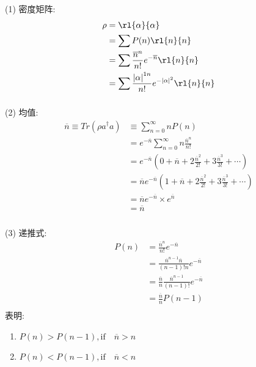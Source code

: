\begin{frame}
 \frametitle{}
  (1) 密度矩阵: 
  \[\begin{aligned} 
 \rho &=\rl{\alpha}{\alpha} \\ 
 &= \sum P(n) \rl{n}{n} \\ 
 & = \sum \frac{\overline{n}^n}{n!} e^{-\overline{n}} \rl{n}{n}  \\ 
 & = \sum \frac{\left|\alpha\right|^{1n}}{n!} e^{-\left|\alpha\right|^2} \rl{n}{n}  \\ 
\end{aligned}\] 
\end{frame}

\begin{frame}
 \frametitle{}
 (2) 均值:
 \[\begin{aligned} 
    \overline{n}  \equiv  Tr(\rho a^{\dagger} a) & \equiv  \sum_{n=0} ^{\infty} n  P(n) \\ 
    &= e^{-\overline{n}} \sum_{n=0} ^{\infty} n \frac{\overline{n}^n}{n!} \\ 
    &= e^{-\overline{n}} \left( 0+ \overline{n} + 2\frac{\overline{n}^2}{2!} +3\frac{\overline{n}^3}{3!} + \cdots \right) \\  
    &= \overline{n} e^{-\overline{n}} \left( 1+ \overline{n} + 2\frac{\overline{n}^2}{2!} +3\frac{\overline{n}^3}{3!} + \cdots \right) \\ 
    &= \overline{n} e^{-\overline{n}} \times e^{\overline{n}}  \\ 
    &= \overline{n} 
\end{aligned}\]     
\end{frame}

\begin{frame}
 \frametitle{}
   (3) 递推式: 
 \[\begin{aligned}
     P(n) &= \frac{\overline{n}^n}{n!} e^{-\overline{n}} \\ 
     &= \frac{\overline{n}^{n-1} \overline{n} }{(n-1)! n} e^{-\overline{n}} \\ 
     &= \frac{\overline{n}}{n}\frac{\overline{n}^{n-1}  }{(n-1)! } e^{-\overline{n}} \\ 
     &= \frac{\overline{n}}{n} P(n-1)\\ 
 \end{aligned}\]   
  表明:
  \begin{enumerate}
      \item $P(n)> P(n-1), \text{if} \quad  \overline{n}> n $
      \item $P(n)< P(n-1), \text{if} \quad \overline{n}< n $
  \end{enumerate}
\end{frame}

